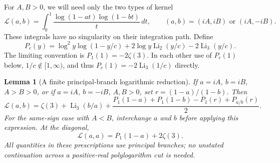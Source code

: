\documentclass[11pt,a4paper]{article}
\numberwithin{equation}{section}
\newtheorem{lemma}[theorem]{Lemma}
\theoremstyle{definition}
\theoremstyle{remark}
\begin{document}
For $A,B>0$, we will need only the two types of kernel
\begin{equation}\label{xid:wat:eq:Ldef}
 \mathcal L(a,b)=\int_0^1
        \frac{\log(1-at)\log(1-bt)}{t}\,dt,
 \qquad (a,b)=(iA,iB)\text{ or }(iA,-iB).
\end{equation}
These integrals have no singularity on their integration path. Define
\begin{equation}\label{xid:wat:eq:P}
 P_c(y)=\log^2y\log(1-y/c)
       +2\log y\operatorname{Li}_2(y/c)
       -2\operatorname{Li}_3(y/c).
\end{equation}
The limiting convention is $P_1(1)=-2\zeta(3)$. In each other use of
$P_c(1)$ below, $1/c\notin[1,\infty)$, and thus
$P_c(1)=-2\operatorname{Li}_3(1/c)$ directly.

\begin{lemma}[A finite principal-branch logarithmic reduction]
\label{xid:wat:lem:L}
If $a=iA$, $b=iB$, $A>B>0$, or if $a=iA$, $b=-iB$, $A,B>0$, set
$r=(1-a)/(1-b)$. Then
\begin{equation}\label{xid:wat:eq:Lclosed}
 \boxed{\displaystyle
 \mathcal L(a,b)=\zeta(3)+\operatorname{Li}_3(b/a)
 +\frac{P_1(1-a)+P_1(1-b)-P_1(r)+P_{a/b}(r)}2.}
\end{equation}
For the same-sign case with $A<B$, interchange $a$ and $b$ before
applying this expression. At the diagonal,
\begin{equation}\label{xid:wat:eq:Ldiagonal}
 \mathcal L(a,a)=P_1(1-a)+2\zeta(3).
\end{equation}
All quantities in these prescriptions use principal branches; no
unstated continuation across a positive-real polylogarithm cut is needed.
\end{lemma}
\end{document}
